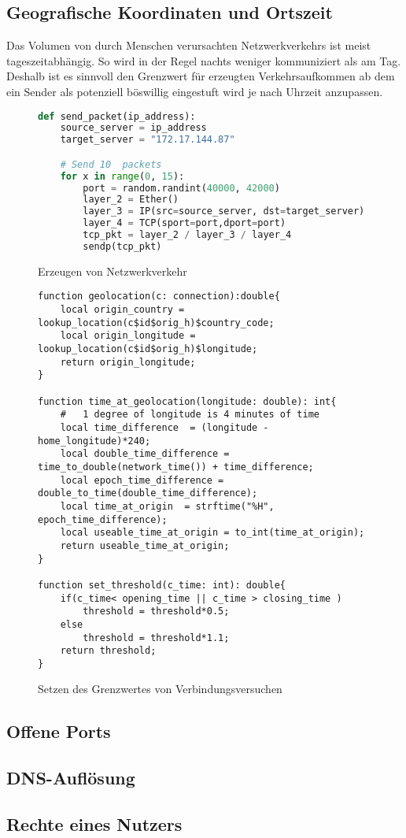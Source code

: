 \subsection{Geografische Koordinaten und Ortszeit}
Das Volumen von durch Menschen verursachten Netzwerkverkehrs ist meist tageszeitabhängig. So wird in der Regel nachts weniger kommuniziert als am Tag.  Deshalb ist es sinnvoll den Grenzwert für erzeugten Verkehrsaufkommen ab dem ein Sender als potenziell böswillig eingestuft wird je nach Uhrzeit anzupassen.\\
\begin{figure}[h!]

\begin{lstlisting}[language=python]
def send_packet(ip_address):
    source_server = ip_address
    target_server = "172.17.144.87"

    # Send 10  packets
    for x in range(0, 15):
        port = random.randint(40000, 42000)
        layer_2 = Ether()
        layer_3 = IP(src=source_server, dst=target_server)
        layer_4 = TCP(sport=port,dport=port)
        tcp_pkt = layer_2 / layer_3 / layer_4
        sendp(tcp_pkt)
\end{lstlisting}
\caption{Erzeugen von Netzwerkverkehr}
\end{figure}

\begin{figure}[h!]
\begin{lstlisting}
function geolocation(c: connection):double{
	local origin_country = lookup_location(c$id$orig_h)$country_code;
	local origin_longitude = lookup_location(c$id$orig_h)$longitude;
	return origin_longitude;
}

function time_at_geolocation(longitude: double): int{
	#	1 degree of longitude is 4 minutes of time
	local time_difference  = (longitude - home_longitude)*240;
	local double_time_difference = time_to_double(network_time()) + time_difference;
	local epoch_time_difference = double_to_time(double_time_difference);
	local time_at_origin  = strftime("%H", epoch_time_difference);
	local useable_time_at_origin = to_int(time_at_origin);
	return useable_time_at_origin;
}

function set_threshold(c_time: int): double{
	if(c_time< opening_time || c_time > closing_time )
		threshold = threshold*0.5;
	else 
		threshold = threshold*1.1;
	return threshold;
}
\end{lstlisting}
\caption{Setzen des Grenzwertes von Verbindungsversuchen}
\end{figure}
\subsection{Offene Ports}
\subsection{DNS-Auflösung}
\subsection{Rechte eines Nutzers}
\subsection{}